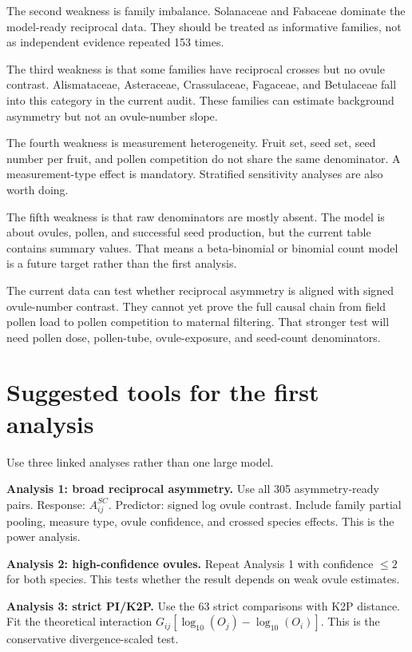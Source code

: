 \documentclass[12pt]{article}
\begin{document}
The second weakness is family imbalance. Solanaceae and Fabaceae dominate the model-ready reciprocal data. They should be treated as informative families, not as independent evidence repeated 153 times.

The third weakness is that some families have reciprocal crosses but no ovule contrast. Alismataceae, Asteraceae, Crassulaceae, Fagaceae, and Betulaceae fall into this category in the current audit. These families can estimate background asymmetry but not an ovule-number slope.

The fourth weakness is measurement heterogeneity. Fruit set, seed set, seed number per fruit, and pollen competition do not share the same denominator. A measurement-type effect is mandatory. Stratified sensitivity analyses are also worth doing.

The fifth weakness is that raw denominators are mostly absent. The model is about ovules, pollen, and successful seed production, but the current table contains summary values. That means a beta-binomial or binomial count model is a future target rather than the first analysis.

\begin{conclusionbox}
The current data can test whether reciprocal asymmetry is aligned with signed ovule-number contrast. They cannot yet prove the full causal chain from field pollen load to pollen competition to maternal filtering. That stronger test will need pollen dose, pollen-tube, ovule-exposure, and seed-count denominators.
\end{conclusionbox}

\section{Suggested tools for the first analysis}

Use three linked analyses rather than one large model.

\textbf{Analysis 1: broad reciprocal asymmetry.} Use all 305 asymmetry-ready pairs. Response: $A^{SC}_{ij}$. Predictor: signed log ovule contrast. Include family partial pooling, measure type, ovule confidence, and crossed species effects. This is the power analysis.

\textbf{Analysis 2: high-confidence ovules.} Repeat Analysis 1 with confidence $\leq 2$ for both species. This tests whether the result depends on weak ovule estimates.

\textbf{Analysis 3: strict PI/K2P.} Use the 63 strict comparisons with K2P distance. Fit the theoretical interaction $G_{ij}[\log_{10}(O_j)-\log_{10}(O_i)]$. This is the conservative divergence-scaled test.
\end{document}
